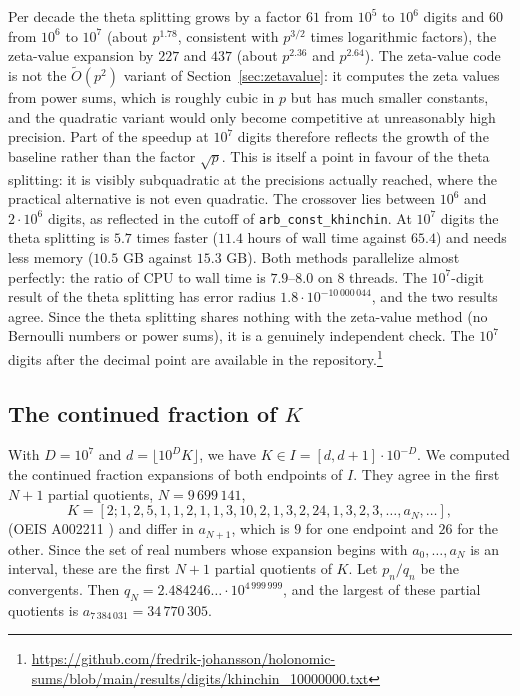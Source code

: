 \documentclass[11pt,reqno]{amsart}
\theoremstyle{definition}
\theoremstyle{remark}
\begin{document}
Per decade the theta splitting grows by a factor $61$ from $10^5$ to $10^6$ digits and $60$ from $10^6$ to $10^7$ (about
$p^{1.78}$, consistent with $p^{3/2}$ times logarithmic factors), the zeta-value expansion by $227$ and $437$ (about
$p^{2.36}$ and $p^{2.64}$). The zeta-value code is not the $\widetilde O(p^2)$ variant of Section~\ref{sec:zetavalue}:
it computes the zeta values from power sums, which is roughly cubic in $p$ but has much smaller constants, and the
quadratic variant would only become competitive at unreasonably high precision. Part of the speedup at $10^7$ digits
therefore reflects the growth of the baseline rather than the factor $\sqrt p$. This is itself a point in favour of
the theta splitting: it is visibly subquadratic at the precisions actually reached, where the practical alternative is
not even quadratic. The crossover
lies between $10^6$ and $2\cdot10^6$ digits, as reflected in the cutoff of \texttt{arb\_const\_khinchin}. At $10^7$
digits the theta splitting is $5.7$ times faster ($11.4$ hours of wall time against $65.4$) and needs less memory
($10.5$ GB against $15.3$ GB). Both methods parallelize almost perfectly: the ratio of CPU to wall time is $7.9$--$8.0$ on
$8$ threads. The $10^7$-digit result of the theta splitting has error radius $1.8\cdot10^{-10\,000\,044}$, and the
two results agree. Since the theta splitting shares nothing with the zeta-value method (no Bernoulli numbers or power
sums), it is a genuinely independent check. The $10^7$ digits after the decimal point are available
in the repository.\footnote{\url{https://github.com/fredrik-johansson/holonomic-sums/blob/main/results/digits/khinchin_10000000.txt}}

\subsection{The continued fraction of $K$}\label{sec:khcf}
With $D = 10^7$ and $d = \lfloor 10^DK\rfloor$, we have $K \in I = [d, d+1] \cdot 10^{-D}$. We computed the
continued fraction expansions of both endpoints of $I$. They agree in the first $N + 1$ partial quotients, $N = 9\,699\,141$,
\[
  K = [2; 1, 2, 5, 1, 1, 2, 1, 1, 3, 10, 2, 1, 3, 2, 24, 1, 3, 2, 3, \ldots, a_N, \ldots],
\]
(OEIS A002211 \cite{OEIS}) and differ in $a_{N+1}$, which is $9$ for one endpoint and $26$ for the other. Since the set of
real numbers whose expansion begins with $a_0, \ldots, a_N$ is an interval, these are the first $N + 1$ partial quotients of
$K$. Let $p_n/q_n$ be the convergents. Then $q_N = 2.484246\ldots\cdot10^{4\,999\,999}$, and the largest of these
partial quotients is $a_{7\,384\,031} = 34\,770\,305$.
\end{document}
